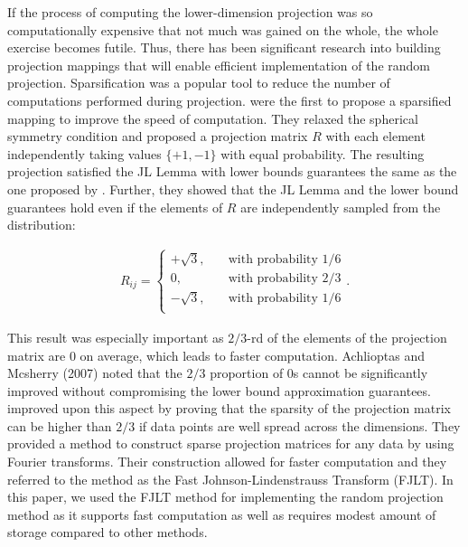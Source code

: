 If the process of computing the lower-dimension projection was so computationally expensive that not much was gained on the whole, the whole exercise becomes futile. Thus, there has been significant research into building projection mappings that will enable efficient implementation of the random projection. Sparsification was a popular tool to reduce the number of computations performed during projection. \cite{achlioptas_fast_2007} were the first to propose a sparsified mapping to improve the speed of computation. They relaxed the spherical symmetry condition and proposed a projection matrix $R$ with each element independently taking values $\{+1,  -1\}$ with equal probability. The resulting projection satisfied the JL Lemma with lower bounds guarantees the same as the one proposed by \cite{dasgupta_elementary_2003}. Further, they showed that the JL Lemma and the lower bound guarantees hold even if the elements of $R$ are independently sampled from the distribution:

\begin{align*}
R_{ij}=
\begin{cases}
+\sqrt{3}, \ \ \ &\mbox{ with probability } 1/6 \\
0, \ \ \ &\mbox{ with probability } 2/3 \\
-\sqrt{3}, \ \ \ &\mbox{ with probability } 1/6 \\
\end{cases}
.
\end{align*} 

This result was especially important as $2/3$-rd of the elements of the projection matrix are 0 on average, which leads to faster computation. Achlioptas and Mcsherry (2007) noted that the $2/3$ proportion of 0s cannot be significantly improved without compromising the lower bound approximation guarantees. \cite{ailon_fast_2009} improved upon this aspect by proving that the sparsity of the projection matrix can be higher than $2/3$ if data points are well spread across the dimensions. They provided a method to construct sparse projection matrices for any data by using Fourier transforms. Their construction allowed for faster computation and they referred to the method as the Fast Johnson-Lindenstrauss Transform (FJLT). In this paper, we used the FJLT method for implementing the random projection method as it supports fast computation as well as requires modest amount of storage compared to other methods. \\

